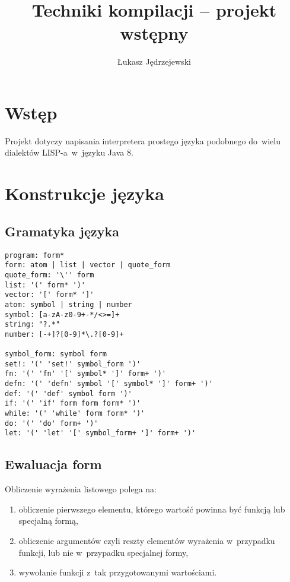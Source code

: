 \documentclass[a4paper,11pt]{article}
\author{Łukasz Jędrzejewski}
\title{Techniki kompilacji -- projekt wstępny}
\date{}
\begin{document}
\maketitle

\section{Wstęp}

Projekt dotyczy napisania interpretera prostego języka podobnego do~wielu
dialektów LISP-a~w~języku Java 8.

\section{Konstrukcje języka}

\subsection{Gramatyka języka}

\begin{verbatim}
program: form*
form: atom | list | vector | quote_form
quote_form: '\'' form
list: '(' form* ')'
vector: '[' form* ']'
atom: symbol | string | number
symbol: [a-zA-z0-9+-*/<>=]+
string: "?.*"
number: [-+]?[0-9]*\.?[0-9]+

symbol_form: symbol form
set!: '(' 'set!' symbol_form ')'
fn: '(' 'fn' '[' symbol* ']' form+ ')'
defn: '(' 'defn' symbol '[' symbol* ']' form+ ')'
def: '(' 'def' symbol form ')'
if: '(' 'if' form form form* ')'
while: '(' 'while' form form* ')'
do: '(' 'do' form+ ')'
let: '(' 'let' '[' symbol_form+ ']' form+ ')'
\end{verbatim}

\subsection{Ewaluacja form}

Obliczenie wyrażenia listowego polega na:
\begin{enumerate}
\item obliczenie pierwszego elementu, którego wartość powinna być funkcją lub
  specjalną formą,
\item obliczenie argumentów czyli reszty elementów wyrażenia w~przypadku
  funkcji, lub nie w~przypadku specjalnej formy,
\item wywołanie funkcji z~tak przygotowanymi wartościami.
\end{enumerate}
\end{document}
